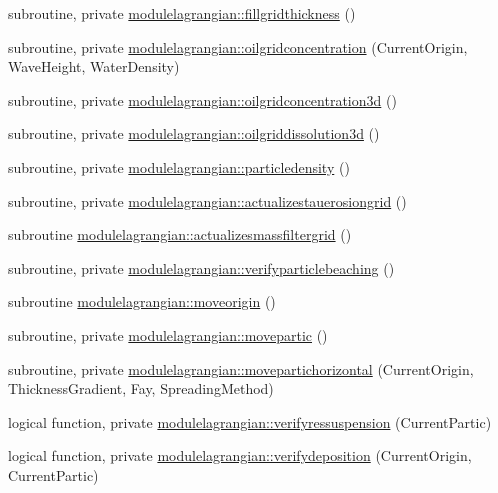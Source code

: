 \begin{DoxyCompactItemize}
\item 
subroutine, private \mbox{\hyperlink{namespacemodulelagrangian_a8232b9379a8d2919b7885bb92a286601}{modulelagrangian\+::fillgridthickness}} ()
\item 
subroutine, private \mbox{\hyperlink{namespacemodulelagrangian_aac3200bb7a0dbdfeccbc61aa00df6387}{modulelagrangian\+::oilgridconcentration}} (Current\+Origin, Wave\+Height, Water\+Density)
\item 
subroutine, private \mbox{\hyperlink{namespacemodulelagrangian_aa09f0dae86aaba5199991f812e815936}{modulelagrangian\+::oilgridconcentration3d}} ()
\item 
subroutine, private \mbox{\hyperlink{namespacemodulelagrangian_a39ff5de7cace8c7c236a47233fb2cb43}{modulelagrangian\+::oilgriddissolution3d}} ()
\item 
subroutine, private \mbox{\hyperlink{namespacemodulelagrangian_a7a7e141a39c3a112666d37b0f6db988e}{modulelagrangian\+::particledensity}} ()
\item 
subroutine, private \mbox{\hyperlink{namespacemodulelagrangian_a9af867ea06d1e0259a9e4cd1a48793bc}{modulelagrangian\+::actualizestauerosiongrid}} ()
\item 
subroutine \mbox{\hyperlink{namespacemodulelagrangian_ab69c4015dc76dd2209a1eda6139be71f}{modulelagrangian\+::actualizesmassfiltergrid}} ()
\item 
subroutine, private \mbox{\hyperlink{namespacemodulelagrangian_abaac5c633b5d8d05a11c32bbee80acaa}{modulelagrangian\+::verifyparticlebeaching}} ()
\item 
subroutine \mbox{\hyperlink{namespacemodulelagrangian_a56e2a0655f742104a77b7d6d4040508f}{modulelagrangian\+::moveorigin}} ()
\item 
subroutine, private \mbox{\hyperlink{namespacemodulelagrangian_ad9212277994fb1a55e17c7e17d66aabc}{modulelagrangian\+::movepartic}} ()
\item 
subroutine, private \mbox{\hyperlink{namespacemodulelagrangian_a9117067712a5138b783af1e0e971235f}{modulelagrangian\+::movepartichorizontal}} (Current\+Origin, Thickness\+Gradient, Fay, Spreading\+Method)
\item 
logical function, private \mbox{\hyperlink{namespacemodulelagrangian_af983501fcd8d5abbf81124ad3229d435}{modulelagrangian\+::verifyressuspension}} (Current\+Partic)
\item 
logical function, private \mbox{\hyperlink{namespacemodulelagrangian_a707d19136d3ce2d287f6e476d28385c8}{modulelagrangian\+::verifydeposition}} (Current\+Origin, Current\+Partic)

\end{DoxyCompactItemize}
